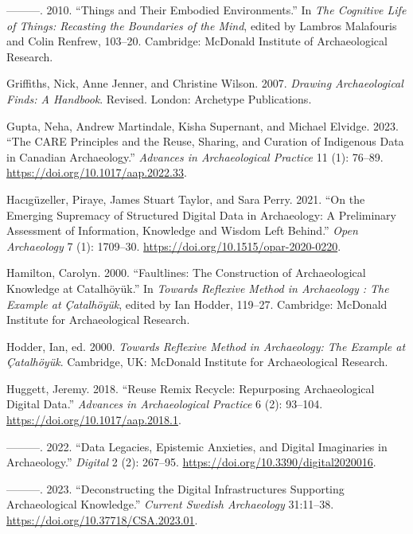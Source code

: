 \documentclass[
]{article}
\newlength{\cslhangindent}
\newenvironment{CSLReferences}[2] %
 {\begin{list}{}{%
  \setlength{\itemindent}{0pt}
  \setlength{\leftmargin}{0pt}
  \setlength{\parsep}{0pt}
  \ifodd #1
   \setlength{\leftmargin}{\cslhangindent}
   \setlength{\itemindent}{-1\cslhangindent}
  \fi
  \setlength{\itemsep}{#2\baselineskip}}}
 {\end{list}}
\begin{document}
\begin{CSLReferences}{1}{0}
---------. 2010. {``Things and Their Embodied Environments.''} In
\emph{The Cognitive Life of Things: {Recasting} the Boundaries of the
Mind}, edited by Lambros Malafouris and Colin Renfrew, 103--20.
Cambridge: McDonald Institute of Archaeological Research.

Griffiths, Nick, Anne Jenner, and Christine Wilson. 2007. \emph{Drawing
Archaeological Finds: A Handbook}. Revised. London: Archetype
Publications.

Gupta, Neha, Andrew Martindale, Kisha Supernant, and Michael Elvidge.
2023. {``The {CARE Principles} and the {Reuse}, {Sharing}, and
{Curation} of {Indigenous Data} in {Canadian Archaeology}.''}
\emph{Advances in Archaeological Practice} 11 (1): 76--89.
\url{https://doi.org/10.1017/aap.2022.33}.

Hacıgüzeller, Piraye, James Stuart Taylor, and Sara Perry. 2021. {``On
the {Emerging Supremacy} of {Structured Digital Data} in {Archaeology}:
{A Preliminary Assessment} of {Information}, {Knowledge} and {Wisdom
Left Behind}.''} \emph{Open Archaeology} 7 (1): 1709--30.
\url{https://doi.org/10.1515/opar-2020-0220}.

Hamilton, Carolyn. 2000. {``Faultlines: {The} Construction of
Archaeological Knowledge at {Catalhöyük}.''} In \emph{Towards Reflexive
Method in Archaeology : The Example at {Çatalhöyük}}, edited by Ian
Hodder, 119--27. Cambridge: McDonald Institute for Archaeological
Research.

Hodder, Ian, ed. 2000. \emph{Towards Reflexive Method in Archaeology:
{The} Example at {Çatalhöyük}}. Cambridge, UK: McDonald Institute for
Archaeological Research.

Huggett, Jeremy. 2018. {``Reuse {Remix Recycle}: {Repurposing
Archaeological Digital Data}.''} \emph{Advances in Archaeological
Practice} 6 (2): 93--104. \url{https://doi.org/10.1017/aap.2018.1}.

---------. 2022. {``Data {Legacies}, {Epistemic Anxieties}, and {Digital
Imaginaries} in {Archaeology}.''} \emph{Digital} 2 (2): 267--95.
\url{https://doi.org/10.3390/digital2020016}.

---------. 2023. {``Deconstructing the {Digital Infrastructures
Supporting Archaeological Knowledge}.''} \emph{Current Swedish
Archaeology} 31:11--38. \url{https://doi.org/10.37718/CSA.2023.01}.


\end{CSLReferences}
\end{document}
